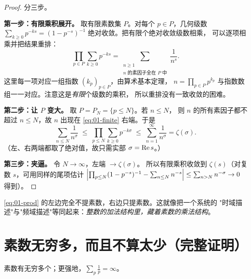\begin{proof}
分三步。

\textbf{第一步：有限乘积展开。} 取有限素数集 $P$。对每个 $p\in P$，几何级数
$\sum_{k\ge0}p^{-ks}=(1-p^{-s})^{-1}$ 绝对收敛。把有限个绝对收敛级数相乘，
可以逐项相乘并把结果重排：
\begin{equation}\label{eq:01-finite}
  \prod_{p\in P}\sum_{k\ge0}p^{-ks}
  =\sum_{\substack{n\ge1\\ \text{$n$ 的素因子全在 $P$ 中}}}\frac{1}{n^{s}}.
\end{equation}
这里每一项对应一组指数 $(k_p)_{p\in P}$，由算术基本定理，
$n=\prod_{p\in P}p^{k_p}$ 与指数数组一一对应。注意这是\emph{有限}个级数的乘积，
所以重排没有一致收敛的困难。

\textbf{第二步：让 $P$ 变大。} 取 $P=P_N=\{p\le N\}$。若 $n\le N$，
则 $n$ 的所有素因子都不超过 $n\le N$，故 $n$ 出现在 \cref{eq:01-finite} 右端。于是
\begin{equation}\label{eq:01-sandwich}
  \sum_{n\le N}\frac{1}{n^{\sigma}}
  \;\le\;
  \prod_{p\le N}\sum_{k\ge0}p^{-k\sigma}
  \;\le\;
  \sum_{n=1}^{\infty}\frac{1}{n^{\sigma}}
  =\zeta(\sigma).
\end{equation}
（左、右两端都取了绝对值，故只需实部 $\sigma=\operatorname{Re} s$。）

\textbf{第三步：夹逼。} 令 $N\to\infty$，左端 $\to\zeta(\sigma)$。
所以有限乘积收敛到 $\zeta(s)$（对复数 $s$，可用同样的尾项估计
$\left\lvert \prod_{p\le N}(1-p^{-s})^{-1}-\sum_{n\le N}n^{-s}\right\rvert
\le\sum_{n>N}n^{-\sigma}\to0$ 得到）。
\end{proof}

\begin{remark}
\cref{eq:01-prod} 的左边完全不提素数，右边只提素数。这就像把一个系统的
"时域描述"与"频域描述"等同起来：\emph{整数的加法结构里，藏着素数的乘法结构}。
\end{remark}

\section{素数无穷多，而且不算太少（完整证明）}
\label{sec:01-infinite}

\begin{theorem}
素数有无穷多个；更强地，$\displaystyle\sum_p \frac1p=\infty$。
\end{theorem}

